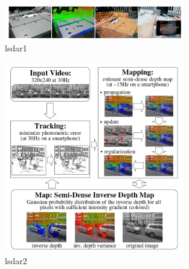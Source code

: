 \documentclass[12pt,twoside]{article}
\begin{document}
\begin{figure}[h]
    \centering
    \includegraphics[width=0.7\textwidth]{figures/lsdar1}
    \caption{lsdar1}
    \label{fig: lsdar1}
\end{figure}

\begin{figure}[h]
    \centering
    \includegraphics[width=0.7\textwidth]{figures/lsdar2}
    \caption{lsdar2}
    \label{fig: lsdar2}
\end{figure}
\end{document}
